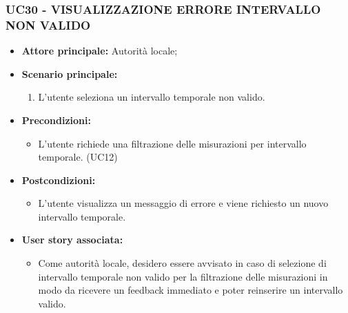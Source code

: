 \subsubsection{UC30 - VISUALIZZAZIONE ERRORE INTERVALLO NON VALIDO}
\begin{itemize}
    \item \textbf{Attore principale:} Autorità locale;
    \item \textbf{Scenario principale:}
          \begin{enumerate}
            \item L'utente seleziona un intervallo temporale non valido.
          \end{enumerate}
    \item \textbf{Precondizioni:}
          \begin{itemize}
              \item  L'utente richiede una filtrazione delle misurazioni per intervallo temporale. (UC12)
          \end{itemize}
    \item \textbf{Postcondizioni:}
          \begin{itemize}
              \item  L'utente visualizza un messaggio di errore e viene richiesto un nuovo intervallo temporale.
          \end{itemize}
    \item \textbf{User story associata:}
          \begin{itemize}
            \item Come autorità locale, desidero essere avvisato in caso di selezione di intervallo temporale non valido per la filtrazione delle misurazioni in modo da ricevere un feedback immediato e poter reinserire un intervallo valido.
          \end{itemize}
\end{itemize}